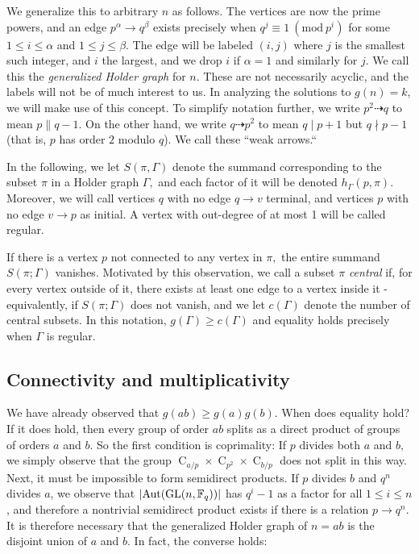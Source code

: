 \documentclass[draft]{article}
\DeclarePairedDelimiter\abs{\lvert}{\rvert}
\newcommand{\aut}[1]{\operatorname{Aut}(#1)}
\newcommand{\cyc}[1]{\operatorname{C}_{#1}}
\newcommand{\gl}[2]{\operatorname{GL}(#1, \mathbb{F}_#2)}
\newcommand{\Mod}[1]{\ (\mathrm{mod} \ #1)}
\theoremstyle{plain}
\theoremstyle{definition}
\begin{document}
We generalize this to arbitrary $n$ as follows. The vertices are now the prime powers, and an edge $p^\alpha \rightarrow q^\beta$ exists precisely when $q^j \equiv 1 \Mod{p^i}$ for some $1 \le i \le \alpha$ and $1 \le j \le \beta$. The edge will be labeled $(i, j)$ where $j$ is the smallest such integer, and $i$ the largest, and we drop $i$ if $\alpha = 1$ and similarly for $j$. We call this the \emph{generalized Holder graph} for $n.$ These are not necessarily acyclic, and the labels will not be of much interest to us. In analyzing the solutions to $g(n) = k$, we will make use of this concept. To simplify notation further, we write $p^2 \dashrightarrow q$ to mean $p \parallel q - 1$. On the other hand, we write $q \dashrightarrow p^2$ to mean $q \mid p + 1$ but $q \nmid p - 1$ (that is, $p$ has order $2$ modulo $q$). We call these ``weak arrows.``

In the following, we let $S(\pi, \Gamma)$ denote the summand corresponding to the subset $\pi$ in a Holder graph $\Gamma,$ and each factor of it will be denoted $h_\Gamma(p, \pi).$ Moreover, we will call vertices $q$ with no edge $q \rightarrow v$ terminal, and vertices $p$ with no edge $v \rightarrow p$ as initial. A vertex with out-degree of at most 1 will be called regular.

If there is a vertex $p$ not connected to any vertex in $\pi,$ the entire summand $S(\pi; \Gamma)$ vanishes. Motivated by this observation, we call a subset $\pi$ \emph{central} if, for every vertex outside of it, there exists at least one edge to a vertex inside it - equivalently, if $S(\pi; \Gamma)$ does not vanish, and we let $c(\Gamma)$ denote the number of central subsets. In this notation, $g(\Gamma) \ge c(\Gamma)$ and equality holds precisely when $\Gamma$ is regular.

\subsection{Connectivity and multiplicativity}
We have already observed that $g(ab) \ge g(a)g(b).$ When does equality hold? If it does hold, then every group of order $ab$ splits as a direct product of groups of orders $a$ and $b.$ So the first condition is coprimality: If $p$ divides both $a$ and $b,$ we simply observe that the group $\cyc{a/p} \times \cyc{p^2} \times \cyc{b/p}$ does not split in this way. Next, it must be impossible to form semidirect products. If $p$ divides $b$ and $q^n$ divides $a$, we observe that $\abs{\aut{\gl{n}{q}}}$ has $q^i - 1$ as a factor for all $1 \le i \le n$, and therefore a nontrivial semidirect product exists if there is a relation $p \rightarrow q^n.$ It is therefore necessary that the generalized Holder graph of $n = ab$ is the disjoint union of $a$ and $b$. In fact, the converse holds:
\end{document}
